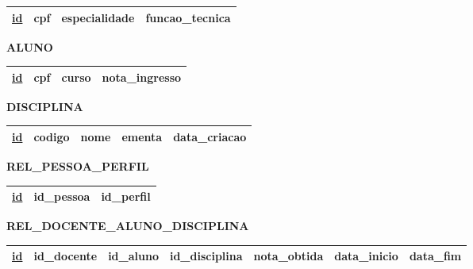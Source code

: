 \documentclass{article}
\begin{document}
\begin{table}[H]
  \renewcommand{\arraystretch}{1.5}
  \begin{tabular}{|c|c|c|c|}
    \hline
    \underline{id} &
    cpf &
    especialidade &
    funcao\_tecnica \\
    \hline
  \end{tabular}
\end{table}

\noindent
\textbf{ALUNO}
\vspace{-5pt}

\begin{table}[H]
  \renewcommand{\arraystretch}{1.5}
  \begin{tabular}{|c|c|c|c|}
    \hline
    \underline{id} &
    cpf &
    curso &
    nota\_ingresso \\
    \hline
  \end{tabular}
\end{table}

\noindent
\textbf{DISCIPLINA}
\vspace{-5pt}

\begin{table}[H]
  \renewcommand{\arraystretch}{1.5}
  \begin{tabular}{|c|c|c|c|c|}
    \hline
    \underline{id} &
    codigo &
    nome &
    ementa &
    data\_criacao \\
    \hline
  \end{tabular}
\end{table}

\noindent
\textbf{REL\_PESSOA\_PERFIL}
\vspace{-5pt}

\begin{table}[H]
  \renewcommand{\arraystretch}{1.5}
  \begin{tabular}{|c|c|c|}
    \hline
    \underline{id} &
    id\_pessoa &
    id\_perfil \\
    \hline
  \end{tabular}
\end{table}

\noindent
\textbf{REL\_DOCENTE\_ALUNO\_DISCIPLINA}
\vspace{-5pt}

\begin{table}[H]
  \renewcommand{\arraystretch}{1.5}
  \begin{tabular}{|c|c|c|c|c|c|c|}
    \hline
    \underline{id} &
    id\_docente &
    id\_aluno &
    id\_disciplina &
    nota\_obtida &
    data\_inicio &
    data\_fim \\
    \hline
  \end{tabular}
\end{table}
\end{document}
